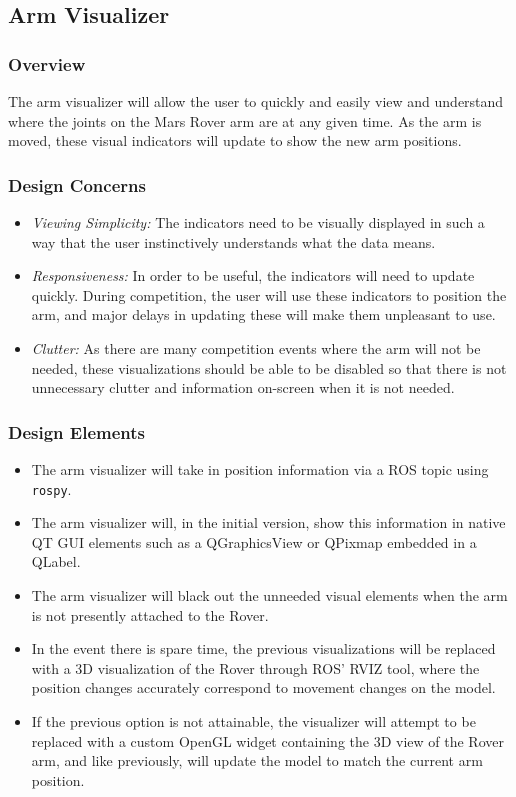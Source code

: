 \subsection{Arm Visualizer}
\subsubsection{Overview}
The arm visualizer will allow the user to quickly and easily view and understand where the joints on the Mars Rover arm are at any given time.
As the arm is moved, these visual indicators will update to show the new arm positions.

\subsubsection{Design Concerns}
\begin{itemize}
\item \textit{Viewing Simplicity:} The indicators need to be visually displayed in such a way that the user instinctively understands what the data means.
\item \textit{Responsiveness:} In order to be useful, the indicators will need to update quickly.
During competition, the user will use these indicators to position the arm, and major delays in updating these will make them unpleasant to use.
\item \textit{Clutter:} As there are many competition events where the arm will not be needed, these visualizations should be able to be disabled so that there is not unnecessary clutter and information on-screen when it is not needed.
\end{itemize}

\subsubsection{Design Elements}
\begin{itemize}
\item The arm visualizer will take in position information via a ROS topic using \texttt{rospy}.
\item The arm visualizer will, in the initial version, show this information in native QT GUI elements such as a QGraphicsView or QPixmap embedded in a QLabel.
\item The arm visualizer will black out the unneeded visual elements when the arm is not presently attached to the Rover.
\item In the event there is spare time, the previous visualizations will be replaced with a 3D visualization of the Rover through ROS' RVIZ tool, where the position changes accurately correspond to movement changes on the model. 
\item If the previous option is not attainable, the visualizer will attempt to be replaced with a custom OpenGL widget containing the 3D view of the Rover arm, and like previously, will update the model to match the current arm position.
\end{itemize}

